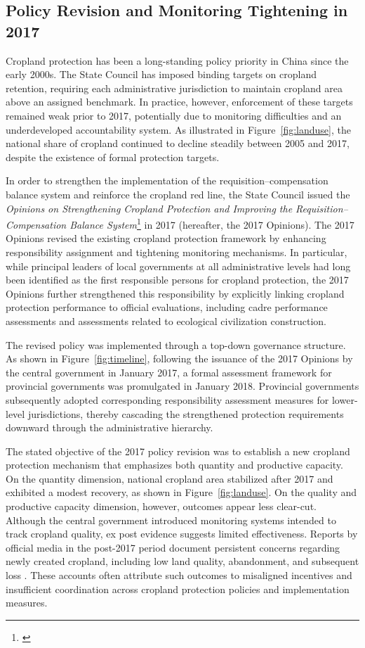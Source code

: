 \subsection{Policy Revision and Monitoring Tightening in 2017}

Cropland protection has been a long-standing policy priority in China since the early 2000s. The State Council has imposed binding targets on cropland retention, requiring each administrative jurisdiction to maintain cropland area above an assigned benchmark. In practice, however, enforcement of these targets remained weak prior to 2017, potentially due to monitoring difficulties and an underdeveloped accountability system. As illustrated in Figure~\ref{fig:landuse}, the national share of cropland continued to decline steadily between 2005 and 2017, despite the existence of formal protection targets.

In order to strengthen the implementation of the requisition--compensation balance system and reinforce the cropland red line, the State Council issued the \textit{Opinions on Strengthening Cropland Protection and Improving the Requisition--Compensation Balance System}\footnote{\cite{CPCStateCouncil2017farmland}} in 2017 (hereafter, the 2017 Opinions). The 2017 Opinions revised the existing cropland protection framework by enhancing responsibility assignment and tightening monitoring mechanisms. In particular, while principal leaders of local governments at all administrative levels had long been identified as the first responsible persons for cropland protection, the 2017 Opinions further strengthened this responsibility by explicitly linking cropland protection performance to official evaluations, including cadre performance assessments and assessments related to ecological civilization construction.

The revised policy was implemented through a top-down governance structure. As shown in Figure~\ref{fig:timeline}, following the issuance of the 2017 Opinions by the central government in January 2017, a formal assessment framework for provincial governments was promulgated in January 2018. Provincial governments subsequently adopted corresponding responsibility assessment measures for lower-level jurisdictions, thereby cascading the strengthened protection requirements downward through the administrative hierarchy.

The stated objective of the 2017 policy revision was to establish a new cropland protection mechanism that emphasizes both quantity and productive capacity. On the quantity dimension, national cropland area stabilized after 2017 and exhibited a modest recovery, as shown in Figure~\ref{fig:landuse}. On the quality and productive capacity dimension, however, outcomes appear less clear-cut. Although the central government introduced monitoring systems intended to track cropland quality, ex post evidence suggests limited effectiveness. Reports by official media in the post-2017 period document persistent concerns regarding newly created cropland, including low land quality, abandonment, and subsequent loss \citep{Wang2023balance}. These accounts often attribute such outcomes to misaligned incentives and insufficient coordination across cropland protection policies and implementation measures.

